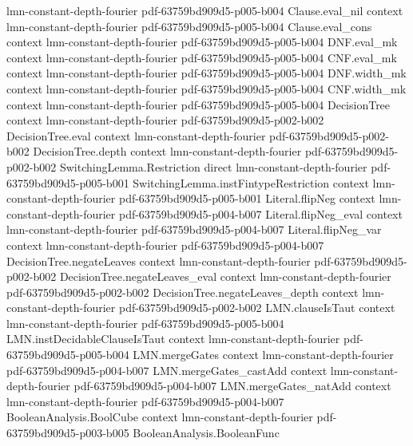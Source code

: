 \begin{lemma}
  {lmn-constant-depth-fourier}
  {pdf-63759bd909d5-p005-b004}
\proofstep
  {Clause.eval_nil}
  {context}
  {lmn-constant-depth-fourier}
  {pdf-63759bd909d5-p005-b004}
\proofstep
  {Clause.eval_cons}
  {context}
  {lmn-constant-depth-fourier}
  {pdf-63759bd909d5-p005-b004}
\proofstep
  {DNF.eval_mk}
  {context}
  {lmn-constant-depth-fourier}
  {pdf-63759bd909d5-p005-b004}
\proofstep
  {CNF.eval_mk}
  {context}
  {lmn-constant-depth-fourier}
  {pdf-63759bd909d5-p005-b004}
\proofstep
  {DNF.width_mk}
  {context}
  {lmn-constant-depth-fourier}
  {pdf-63759bd909d5-p005-b004}
\proofstep
  {CNF.width_mk}
  {context}
  {lmn-constant-depth-fourier}
  {pdf-63759bd909d5-p005-b004}
\proofstep
  {DecisionTree}
  {context}
  {lmn-constant-depth-fourier}
  {pdf-63759bd909d5-p002-b002}
\proofstep
  {DecisionTree.eval}
  {context}
  {lmn-constant-depth-fourier}
  {pdf-63759bd909d5-p002-b002}
\proofstep
  {DecisionTree.depth}
  {context}
  {lmn-constant-depth-fourier}
  {pdf-63759bd909d5-p002-b002}
\proofstep
  {SwitchingLemma.Restriction}
  {direct}
  {lmn-constant-depth-fourier}
  {pdf-63759bd909d5-p005-b001}
\proofstep
  {SwitchingLemma.instFintypeRestriction}
  {context}
  {lmn-constant-depth-fourier}
  {pdf-63759bd909d5-p005-b001}
\proofstep
  {Literal.flipNeg}
  {context}
  {lmn-constant-depth-fourier}
  {pdf-63759bd909d5-p004-b007}
\proofstep
  {Literal.flipNeg_eval}
  {context}
  {lmn-constant-depth-fourier}
  {pdf-63759bd909d5-p004-b007}
\proofstep
  {Literal.flipNeg_var}
  {context}
  {lmn-constant-depth-fourier}
  {pdf-63759bd909d5-p004-b007}
\proofstep
  {DecisionTree.negateLeaves}
  {context}
  {lmn-constant-depth-fourier}
  {pdf-63759bd909d5-p002-b002}
\proofstep
  {DecisionTree.negateLeaves_eval}
  {context}
  {lmn-constant-depth-fourier}
  {pdf-63759bd909d5-p002-b002}
\proofstep
  {DecisionTree.negateLeaves_depth}
  {context}
  {lmn-constant-depth-fourier}
  {pdf-63759bd909d5-p002-b002}
\proofstep
  {LMN.clauseIsTaut}
  {context}
  {lmn-constant-depth-fourier}
  {pdf-63759bd909d5-p005-b004}
\proofstep
  {LMN.instDecidableClauseIsTaut}
  {context}
  {lmn-constant-depth-fourier}
  {pdf-63759bd909d5-p005-b004}
\proofstep
  {LMN.mergeGates}
  {context}
  {lmn-constant-depth-fourier}
  {pdf-63759bd909d5-p004-b007}
\proofstep
  {LMN.mergeGates_castAdd}
  {context}
  {lmn-constant-depth-fourier}
  {pdf-63759bd909d5-p004-b007}
\proofstep
  {LMN.mergeGates_natAdd}
  {context}
  {lmn-constant-depth-fourier}
  {pdf-63759bd909d5-p004-b007}
\proofstep
  {BooleanAnalysis.BoolCube}
  {context}
  {lmn-constant-depth-fourier}
  {pdf-63759bd909d5-p003-b005}
\proofstep
  {BooleanAnalysis.BooleanFunc}

\end{lemma}
